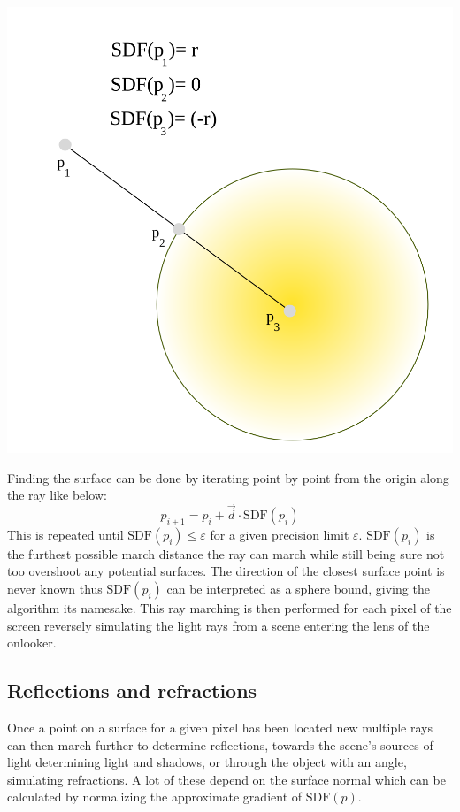 		\hfill
		\begin{minipage}{0.3\textwidth}
			\includegraphics[width=\linewidth]{figure/SDF} 
		\end{minipage}
		
		\bigskip
		
		Finding the surface can be done by iterating point by point from the
		origin along the ray like below: $$p_{i+1} = p_i + \vec{d}\cdot
		\text{SDF}(p_i)$$ This is repeated until $\text{SDF}(p_i) \leq
		\varepsilon$ for a given precision limit $\varepsilon$.
		$\text{SDF}(p_i)$ is the furthest possible march distance the ray can march
		 while still being sure not too overshoot any potential surfaces.  The direction of the
		closest surface point is never known thus $\text{SDF}(p_i)$ can be
		interpreted as a sphere bound, giving the algorithm its namesake. This
		ray marching is then performed for each pixel of the screen reversely
		simulating the light rays from a scene entering the lens of the
		onlooker.
			
			\subsection{Reflections and refractions}
		
				Once a point on a surface for a given pixel has been located
				new multiple rays can then march further to determine
				reflections, towards the scene's sources of light determining
				light and shadows, or through the object with an angle,
				simulating refractions. A lot of these depend on the surface
				normal which can be calculated by normalizing the approximate
				gradient of $\text{SDF}(p)$. 
		
